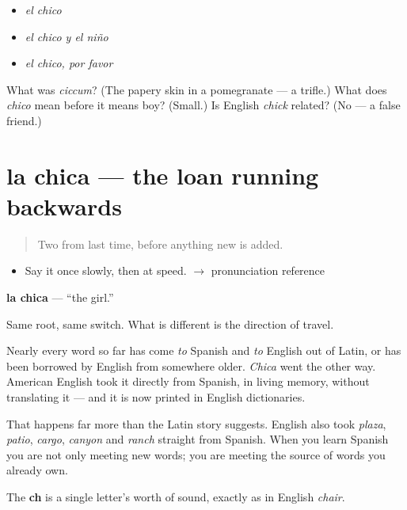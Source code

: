 \begin{itemize}
\raggedright
  \item \emph{el chico}
  \item \emph{el chico y el niño}
  \item \emph{el chico, por favor}
\end{itemize}

\begin{tcolorbox}[breakable,colback=teal!4,colframe=teal!35!black,title={Before you move on}]
What was \emph{ciccum}? (The papery skin in a pomegranate --- a trifle.) What does \emph{chico} mean before it means boy? (Small.) Is English \emph{chick} related? (No --- a false friend.)
\end{tcolorbox}
\section[la chica]{la chica --- the loan running backwards}

\label{lesson:ES-C308-chica}



\begin{quote}
Two from last time, before anything new is added.
\end{quote}

\begin{sounds}
\begin{itemize}
\raggedright
  \item Say it once slowly, then at speed. $\to$ pronunciation reference
\end{itemize}
\end{sounds}

\begin{cousinweb}
\textbf{la chica} --- \textquotedblleft{}the girl.\textquotedblright{}

Same root, same switch. What is different is the direction of travel.

Nearly every word so far has come \emph{to} Spanish and \emph{to} English out of Latin, or has been borrowed by English from somewhere older. \emph{Chica} went the other way. American English took it directly from Spanish, in living memory, without translating it --- and it is now printed in English dictionaries.

That happens far more than the Latin story suggests. English also took \emph{plaza}, \emph{patio}, \emph{cargo}, \emph{canyon} and \emph{ranch} straight from Spanish. When you learn Spanish you are not only meeting new words; you are meeting the source of words you already own.

The \textbf{ch} is a single letter's worth of sound, exactly as in English \emph{chair}.
\end{cousinweb}

